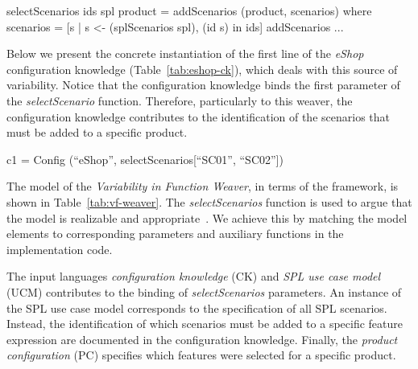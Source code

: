 \begin{code}
 selectScenarios ids spl product =
  addScenarios (product, scenarios)
  where 	
    scenarios = [s | s <- (splScenarios spl), (id s) in ids]
    addScenarios ...
\end{code}

Below we present the concrete instantiation of the first line of the
\emph{eShop} configuration knowledge (Table~\ref{tab:eshop-ck}), which deals with this
source of variability. Notice that the configuration knowledge
binds the first parameter of the \emph{selectScenario} function. Therefore,
particularly to this weaver, the configuration knowledge contributes to
the identification of the scenarios that must be added to a specific product.


\begin{code}
c1 = Config (``eShop'',
   selectScenarios[``SC01'', ``SC02''])
\end{code}

The model of the \emph{Variability in Function Weaver}, in terms of the
framework, is shown in Table~\ref{tab:vf-weaver}. The \emph{selectScenarios}
function is used to argue that the model is realizable and
appropriate~\cite{Masuhara:2003aa}.
We achieve this by matching the model elements to
corresponding parameters and auxiliary functions in the implementation code.

The input languages
\emph{configuration knowledge} (CK) and \emph{SPL use case model} (UCM) contributes to the
binding of \emph{selectScenarios} parameters. An instance of the SPL use
case model corresponds to the specification of all SPL scenarios.
Instead, the identification of which scenarios must be added to a specific
feature expression are documented in the configuration knowledge. Finally, the
\emph{product configuration} (PC) specifies which features were selected for a
specific product.

